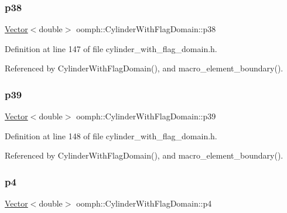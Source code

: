\subsubsection{\texorpdfstring{p38}{p38}}
{\footnotesize\ttfamily \hyperlink{classoomph_1_1Vector}{Vector}$<$double$>$ oomph\+::\+Cylinder\+With\+Flag\+Domain\+::p38\hspace{0.3cm}{\ttfamily [private]}}



Definition at line 147 of file cylinder\+\_\+with\+\_\+flag\+\_\+domain.\+h.



Referenced by Cylinder\+With\+Flag\+Domain(), and macro\+\_\+element\+\_\+boundary().

\mbox{\label{classoomph_1_1CylinderWithFlagDomain_a0b6726667f09eeabad0885858e684ff0}} 
\subsubsection{\texorpdfstring{p39}{p39}}
{\footnotesize\ttfamily \hyperlink{classoomph_1_1Vector}{Vector}$<$double$>$ oomph\+::\+Cylinder\+With\+Flag\+Domain\+::p39\hspace{0.3cm}{\ttfamily [private]}}



Definition at line 148 of file cylinder\+\_\+with\+\_\+flag\+\_\+domain.\+h.



Referenced by Cylinder\+With\+Flag\+Domain(), and macro\+\_\+element\+\_\+boundary().

\mbox{\label{classoomph_1_1CylinderWithFlagDomain_a060890ea588f8e5833d518fa707fe774}} 
\subsubsection{\texorpdfstring{p4}{p4}}
{\footnotesize\ttfamily \hyperlink{classoomph_1_1Vector}{Vector}$<$double$>$ oomph\+::\+Cylinder\+With\+Flag\+Domain\+::p4\hspace{0.3cm}{\ttfamily [private]}}



